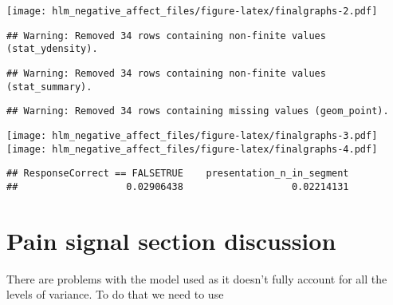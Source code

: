\documentclass[]{article}
\begin{document}
\texttt{[image: hlm\_negative\_affect\_files/figure-latex/finalgraphs-2.pdf]}

\begin{verbatim}
## Warning: Removed 34 rows containing non-finite values (stat_ydensity).
\end{verbatim}

\begin{verbatim}
## Warning: Removed 34 rows containing non-finite values (stat_summary).
\end{verbatim}

\begin{verbatim}
## Warning: Removed 34 rows containing missing values (geom_point).
\end{verbatim}

\texttt{[image: hlm\_negative\_affect\_files/figure-latex/finalgraphs-3.pdf]}
\texttt{[image: hlm\_negative\_affect\_files/figure-latex/finalgraphs-4.pdf]}

\begin{verbatim}
## ResponseCorrect == FALSETRUE    presentation_n_in_segment 
##                   0.02906438                   0.02214131
\end{verbatim}

\section{Pain signal section
discussion}\label{pain-signal-section-discussion}

There are problems with the model used as it doesn't fully account for
all the levels of variance. To do that we need to use
\end{document}
